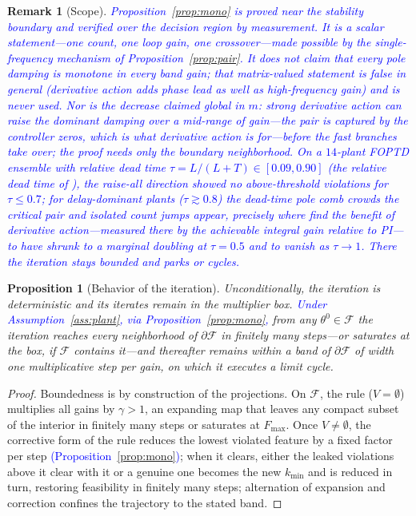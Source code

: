 \documentclass[final,3p,times,twocolumn]{elsarticle}
\newcommand{\revb}[1]{\textcolor{blue}{#1}} %
\newcommand{\revd}[1]{\textcolor{blue}{#1}} %
\newcommand{\reve}[1]{\textcolor{blue}{#1}} %
\newcommand{\revf}[1]{\textcolor{blue}{#1}} %
\newtheorem{proposition}{Proposition}
\newtheorem{remark}{Remark}
\begin{document}
\begin{remark}[Scope]\label{rem:scope}
\revd{Proposition~\ref{prop:mono} is proved near the stability
boundary and verified over the decision region by measurement. It is
a scalar statement---one count, one loop gain, one crossover---made
possible by the single-frequency mechanism of
Proposition~\ref{prop:pair}. It does not claim that every pole damping
is monotone in every band gain; that matrix-valued statement is false
in general (derivative action adds phase lead as well as
high-frequency gain) and is never used. Nor is the decrease claimed
global in $m$: strong derivative action can raise the dominant damping
over a mid-range of gain---the pair is captured by the controller
zeros, which is what derivative action is for---before the fast
branches take over; the proof needs only the boundary neighborhood.
On a $14$-plant FOPTD ensemble with relative dead time
\reve{$\tau = L/(L{+}T)\in[0.09,0.90]$}\revf{ (the relative dead time
of \cite{AstromHagglund2004})}, the raise-all direction showed
no above-threshold violations for $\tau\le 0.7$; for delay-dominant
plants ($\tau\gtrsim 0.8$) the dead-time
pole comb crowds the critical
pair and isolated count jumps appear\revf{, precisely where
\cite{AstromHagglund2004} find the benefit of derivative action---measured
there by the achievable integral gain relative to PI---to have shrunk
to a marginal doubling at $\tau=0.5$ and to vanish as $\tau\to1$}. There the
iteration stays bounded and parks or cycles.}
\end{remark}

\begin{proposition}[Behavior of the iteration]\label{prop:conv}
Unconditionally, the iteration is deterministic and its iterates remain in
the multiplier box. \revb{Under Assumption~\ref{ass:plant}, via
Proposition~\ref{prop:mono},} from any
$\theta^0 \in \mathcal F$ the iteration reaches every neighborhood of
$\partial\mathcal F$ in finitely many steps---or saturates at the box, if
$\mathcal F$ contains it---and thereafter remains within a band of
$\partial\mathcal F$ of width one multiplicative step per gain, on which
it executes a limit cycle.
\end{proposition}

\begin{proof}
Boundedness is by construction of the projections. On $\mathcal F$,
the rule ($V = \emptyset$) multiplies all gains by $\gamma > 1$, an expanding map that
leaves any compact subset of the interior in finitely many steps or
saturates at $F_{\max}$. Once $V \ne \emptyset$, the corrective form of
the rule reduces the lowest violated feature by a fixed factor per step
\revb{(Proposition~\ref{prop:mono})}; when it clears, either the leaked
violations above it clear with it or a genuine one becomes the new
$k_{\min}$ and is reduced in turn, restoring feasibility in finitely
many steps; alternation of expansion and correction confines the
trajectory to the stated band.
\end{proof}
\end{document}
